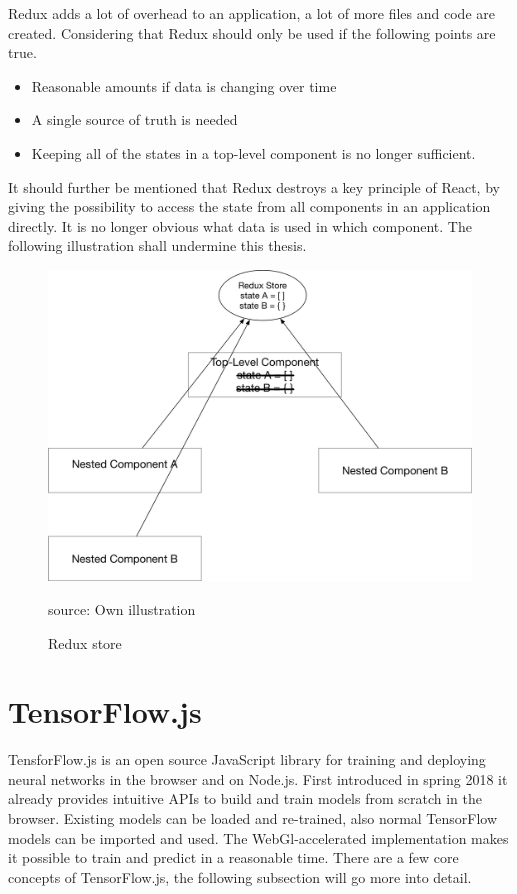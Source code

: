 Redux adds a lot of overhead to an application, a lot of more files and code are created. Considering that Redux should only be used if the following points are true. 

\begin{itemize}
\item Reasonable amounts if data is changing over time
\item A single source of truth is needed
\item Keeping all of the states in a top-level component is no longer sufficient.
\end{itemize}

It should further be mentioned that Redux destroys a key principle of React, by giving the possibility to access the state from all components in an application directly. It is no longer obvious what data is used in which component. The following illustration shall undermine this thesis.

\begin{figure}[H]
	\centering
	\includegraphics[width=0.8\linewidth]{bilder/grundlagen/reduxStore.png}
	\caption{Redux store} source: Own illustration
	\label{fig:COMPONENT}
\end{figure}

\section{TensorFlow.js}
TensforFlow.js is an open source JavaScript library for training and deploying neural networks in the browser and on Node.js. First introduced in spring 2018 it already provides intuitive APIs to build and train models from scratch in the browser. Existing models can be loaded and re-trained, also normal TensorFlow models can be imported and used. The WebGl-accelerated implementation makes it possible to train and predict in a reasonable time. There are a few core concepts of TensorFlow.js, the following subsection will go more into detail.

